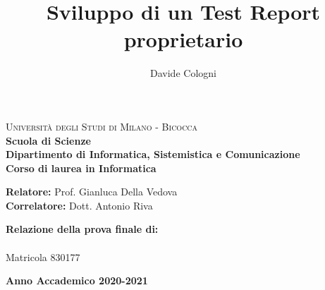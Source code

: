\documentclass[a4paper,12pt,twoside,openright]{report}
\title{Sviluppo di un Test Report proprietario}
\author{Davide Cologni}
\makeatletter
\let\inserttitle\@title
\let\insertauthor\@author
\makeatother
\begin{document}
    
    \begin{titlepage}
        
        \noindent
        \begin{minipage}[t]{0.19\textwidth}
        \end{minipage}
        \begin{minipage}[t]{0.81\textwidth}
        {
                {\textsc{Università degli Studi di Milano - Bicocca}} \\
                \textbf{Scuola di Scienze} \\
                \textbf{Dipartimento di Informatica, Sistemistica e Comunicazione} \\
                \textbf{Corso di laurea in Informatica} \\
                \par
        }
        \end{minipage}
        
	\vspace{40mm}
        
	\begin{center}
            {\LARGE{
                    \textbf{\inserttitle}
                    \par
            }}
        \end{center}
        
        \vspace{50mm}

        \noindent
        {\large \textbf{Relatore:} Prof. Gianluca Della Vedova } \\

        \noindent
        {\large \textbf{Correlatore:} Dott. Antonio Riva}
        
        \vspace{15mm}

        \begin{flushright}
            {\large \textbf{Relazione della prova finale di:}} \\
            \large{\insertauthor} \\
            \large{Matricola 830177} 
        \end{flushright}
        
        \vspace{40mm}
        \begin{center}
            {\large{\bf Anno Accademico 2020-2021}}
        \end{center}
        
        \restoregeometry
        
    \end{titlepage}
\end{document}
